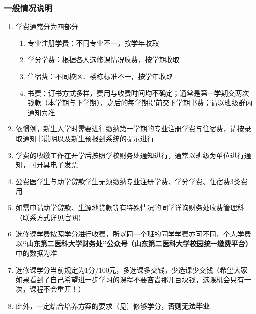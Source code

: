 \subsubsection[一般情况说明]{一般情况说明}
\label{tuition}
\begin{enumerate}
    \item 学费通常分为四部分\footnotemark
          \begin{enumerate}
              \item 专业注册学费：不同专业不一，按学年收取
              \item 学分学费：根据各人选修课情况收费，按学期收取
              \item 住宿费：不同校区、楼栋标准不一，按学年收取
              \item 书费：订书方式多样，费用与收费时间均不确定；通常是第一学期交两次钱款（本学期与下学期），之后的每学期提前交下学期书费；请以班级群内通知为准
          \end{enumerate}
    \item 依惯例，新生入学时需要进行缴纳第一学期的专业注册学费与住宿费，请按录取通知书说明以及新生预报到系统\footnotemark 的提示进行
    \item 学费的收缴工作在开学后按照学校财务处通知进行，通常以班级为单位进行通知，可开具电子发票
    \item 公费医学生与助学贷款学生无须缴纳专业注册学费、学分学费、住宿费3类费用
    \item 如需申请助学贷款、生源地贷款等有特殊情况的同学详询财务处收费管理科（联系方式详见官网）
    \item 选修课学费按照学分进行收费，所以同一个班的同学学费亦可不同，个人学费以\textbf{“山东第二医科大学财务处”公众号（山东第二医科大学校园统一缴费平台）}中的数据为准
    \item 选修课学分当前规定为1分/100元，多选课多交钱，少选课少交钱（希望大家如果看到了自己希望进一步学习的课程不要吝啬那几百块钱，选课机会只有一次，课程不会重开！）
    \item 此外，一定结合培养方案的要求（见）修够学分，\textbf{否则无法毕业}
\end{enumerate}

